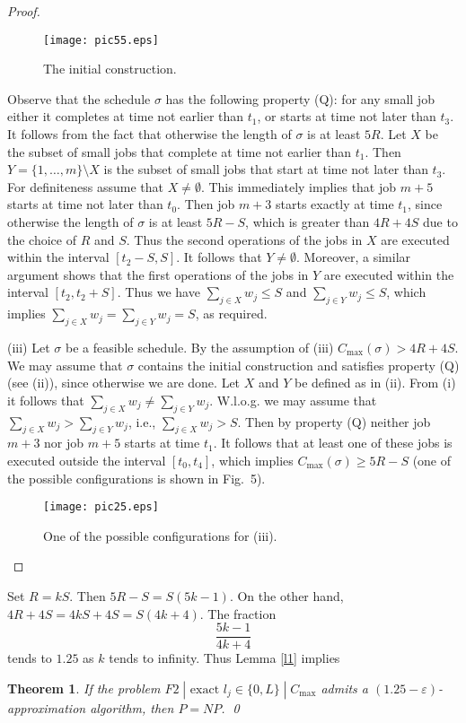 \documentclass[12pt,a4paper]{article}
\newtheorem{theorem}{Theorem}
\begin{document}
\begin{proof}
\begin{figure}[h]
\vspace{1mm}
\begin{center}
\texttt{[image: pic55.eps]}
  \caption{The  initial construction.}
\end{center}
\label{fig4}
\end{figure}
Observe that the schedule $\sigma$ has the following property (Q):
for any small job either it completes at time not earlier than
$t_1$, or starts at time not later than $t_3$. It follows from the
fact that otherwise the length of $\sigma$ is at least $5R$. Let $X$
be the subset of small jobs that complete at time not earlier than
$t_1$. Then $Y=\{1,\ldots , m\}\setminus X$ is the subset of small
jobs that start at time not later than $t_3$. For definiteness
assume that $X\not= \emptyset$. This immediately implies that job
$m+5$ starts at time not later than $t_0$. Then job $m+3$ starts
exactly at time $t_1$, since otherwise the length of $\sigma$ is at
least $5R-S$, which is greater than $4R+4S$ due to the choice of $R$
and $S$. Thus the second operations of the jobs in $X$ are executed
within the interval $[t_2-S,S]$. It follows that $Y\not=\emptyset$.
Moreover, a similar argument shows that the first operations of the
jobs in $Y$ are executed within the interval $[t_2, t_2+S]$. Thus we
have $\sum_{j\in X}{w_j}\leq S$ and $\sum_{j\in Y}{w_j}\leq S$,
which implies $\sum_{j\in X}{w_j}=\sum_{j\in Y}{w_j}=S$, as
required.

(iii) Let $\sigma$ be a feasible schedule. By the assumption of
(iii) $C_{\max}(\sigma)>4R+4S$. We may assume that $\sigma$ contains
the initial construction and satisfies property (Q) (see (ii)),
since otherwise we are done. Let $X$ and $Y$ be defined as in (ii).
From (i) it follows that $\sum_{j\in X}w_j\not=\sum_{j\in Y}w_j$.
W.l.o.g. we may assume that $\sum_{j\in X}w_j>\sum_{j\in Y}w_j$,
i.e., $\sum_{j\in X}w_j>S$. Then by property (Q) neither job $m+3$
nor job $m+5$ starts at time $t_1$. It follows that at least one of
these jobs is executed outside the interval $[t_0,t_4]$, which
implies $C_{\max}(\sigma)\geq 5R-S$ (one of the possible
configurations is shown in Fig.~5). %
\begin{figure}[h]
\vspace{1mm}
\begin{center}
\texttt{[image: pic25.eps]}
  \caption{One of the possible configurations for (iii).}
\end{center}
\end{figure}
\end{proof}
Set $R=kS$. Then $5R-S=S(5k-1)$. On the other hand,
$4R+4S=4kS+4S=S(4k+4)$. The fraction
$$\frac{5k-1}{4k+4}$$
tends to $1.25$ as $k$ tends to infinity. Thus Lemma \ref{l1}
implies
\begin{theorem}
If the problem $F2\;|\mbox{ exact }l_j\in \{0,L\}\;|\;C_{\max}$
admits a $(1.25-\varepsilon)$-approximation algorithm, then $P=NP$.
\qed
\end{theorem}
\end{document}
